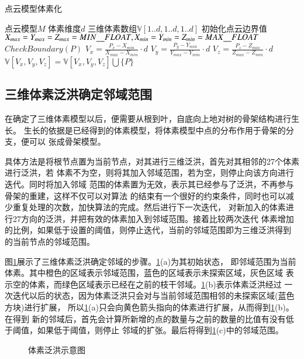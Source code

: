\begin{algorithm}[H]
	\caption{点云模型体素化}
\begin{algorithmic}[1]
	\Require 点云模型$M$
	\Require 体素维度$d$
	\Ensure 三维体素数组$\mathbb{V}[1..d,1..d,1..d]$
	\State 初始化点云边界值$X_{max}=Y_{max}=Z_{max}=MIN\uline\quad FLOAT,X_{min}=Y_{min}=Z_{min}=MAX\uline\quad FLOAT$
		\State $CheckBoundary(P)$
	\EndFor
{}
\State $V_x = \frac{P_x-X_{min}}{X_{max}-X_{min}}\cdot d$
\State $V_y = \frac{P_y-Y_{min}}{Y_{max}-Y_{min}}\cdot d$
\State $V_z = \frac{P_z-Z_{min}}{Z_{max}-Z_{min}}\cdot d$
\State $\mathbb{V}[V_x, V_y, V_z] = \mathbb{V}[V_x, V_y, V_z] \bigcup \{P\} $
	\EndFor
\end{algorithmic}
\end{algorithm}

\subsection{三维体素泛洪确定邻域范围}
在确定了三维体素模型以后，便需要从根到叶，自底向上地对树的骨架结构进行生长。
生长的依据是已经得到的体素模型，将体素模型中点的分布作用于骨架的分支，便可以
张成骨架模型。

具体方法是将根节点置为当前节点，对其进行三维泛洪，首先对其相邻的27个体素进行泛洪，若
体素不为空，则将其加入邻域范围，若为空，则停止向该方向进行迭代。同时将加入邻域
范围的体素置为无效，表示其已经参与了泛洪，不再参与骨架的重建，这样不仅可以对算法
的结束有一个很好的约束条件，同时也可以减少重复处理的次数，加快算法的完成。然后进行下一次迭代，
对新加入的体素进行27方向的泛洪，并把有效的体素加入到邻域范围。接着比较两次迭代
体素增加的比例，如果低于设置的阈值，则停止迭代，当前的邻域范围即为三维泛洪得到
的当前节点的邻域范围。

图\ref{fig:3dfld}展示了三维体素泛洪确定邻域的步骤。\ref{fig:3dfld}(a)为其初始状态，
即邻域范围为当前体素。其中橙色的区域表示邻域范围，蓝色的区域表示未探索区域，灰色区域
表示空的体素，而绿色区域表示已经在之前的枝干邻域。\ref{fig:3dfld}(b)表示体素泛洪经过
一次迭代以后的状态，因为体素泛洪只会对与当前邻域范围相邻的未探索区域(蓝色方块)进行扩展，
所以\ref{fig:3dfld}(a)只会向黄色箭头指向的体素进行扩展，从而得到\ref{fig:3dfld}(b)。在得到
新的邻域后，首先会计算所新增的点的数量与之前的数量的比值有没有低于阈值，如果低于阈值，则停止
邻域的扩张。最后将得到\ref{fig:3dfld}(c)中的邻域范围。

\begin{figure}[H]
	\centering
	\hspace{4em}
	\hspace{4em}
	\caption{体素泛洪示意图}
	\label{fig:3dfld}
\end{figure}

